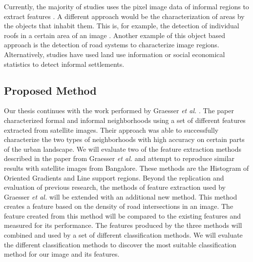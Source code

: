 Currently, the majority of studies uses the pixel image data of informal regions to extract features \cite{kuffer2016slums}. A different approach would be the characterization of areas by the objects that inhabit them. This is, for example, the detection of individual roofs in a certain area  of an image \cite{williams2016automatic}. Another example of this object based approach is the detection of road systems to characterize image regions. Alternatively, studies have used land use information \cite{novack2010urban} or social economical statistics \cite{engstrom2011using} to detect informal settlements.



 
\subsection{Proposed Method}

Our thesis continues with the work performed by Graesser \textit{et al.} \cite{graesser2012image}. The paper characterized formal and informal neighborhoods using a set of different features extracted from satellite images. Their approach was able to successfully characterize the two types of neighborhoods with high accuracy on certain parts of the urban landscape. We will evaluate two of the feature extraction methods described in the paper from Graesser \textit{et al.} and attempt to reproduce similar results with satellite images from Bangalore. These methods are the Histogram of Oriented Gradients and Line support regions. Beyond the replication and evaluation of previous research, the methods of feature extraction used by Graesser \textit{et al.} will be extended with an additional new method. This method creates a feature based on the density of road intersections in an image. The feature created from this method will be compared to the existing features and measured for its performance. The features produced by the three methods will combined and used by a set of different classification methods.
We will evaluate the different classification methods to discover the most suitable classification method for our image and its features. 

